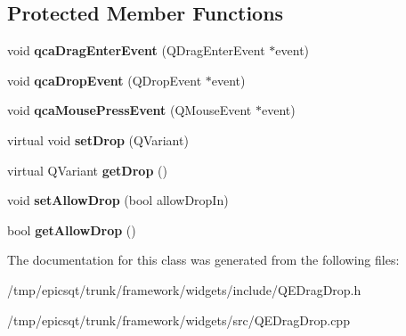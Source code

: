 \subsection*{Protected Member Functions}
\begin{DoxyCompactItemize}
\item 
\hypertarget{classQEDragDrop_a7a039a9b815e5173c82632a687d1f79a}{
void {\bfseries qcaDragEnterEvent} (QDragEnterEvent $\ast$event)}
\label{classQEDragDrop_a7a039a9b815e5173c82632a687d1f79a}

\item 
\hypertarget{classQEDragDrop_a7eb6861626da57fbf0726f0bd5a4aa1d}{
void {\bfseries qcaDropEvent} (QDropEvent $\ast$event)}
\label{classQEDragDrop_a7eb6861626da57fbf0726f0bd5a4aa1d}

\item 
\hypertarget{classQEDragDrop_afc31921193a78c8ebc9823724c92ebb8}{
void {\bfseries qcaMousePressEvent} (QMouseEvent $\ast$event)}
\label{classQEDragDrop_afc31921193a78c8ebc9823724c92ebb8}

\item 
\hypertarget{classQEDragDrop_a3206a518cd628b18c428da22e35cae4c}{
virtual void {\bfseries setDrop} (QVariant)}
\label{classQEDragDrop_a3206a518cd628b18c428da22e35cae4c}

\item 
\hypertarget{classQEDragDrop_aa1f8bab04a718356fcc4ecbc6b26d785}{
virtual QVariant {\bfseries getDrop} ()}
\label{classQEDragDrop_aa1f8bab04a718356fcc4ecbc6b26d785}

\item 
\hypertarget{classQEDragDrop_aede496b3efd7a55f30aa14723faee63e}{
void {\bfseries setAllowDrop} (bool allowDropIn)}
\label{classQEDragDrop_aede496b3efd7a55f30aa14723faee63e}

\item 
\hypertarget{classQEDragDrop_a481fabed6aabe4d56b709514cc7d7617}{
bool {\bfseries getAllowDrop} ()}
\label{classQEDragDrop_a481fabed6aabe4d56b709514cc7d7617}

\end{DoxyCompactItemize}


The documentation for this class was generated from the following files:\begin{DoxyCompactItemize}
\item 
/tmp/epicsqt/trunk/framework/widgets/include/QEDragDrop.h\item 
/tmp/epicsqt/trunk/framework/widgets/src/QEDragDrop.cpp\end{DoxyCompactItemize}

